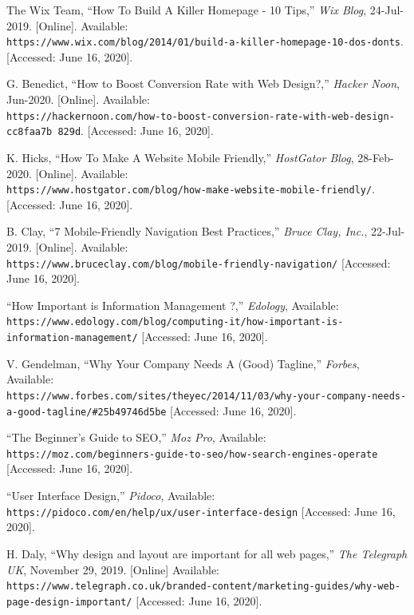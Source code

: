\documentclass[12pt]{article}
\begin{document}
\begin{thebibliography}{9}
The Wix Team, “How To Build A Killer Homepage - 10 Tips,” \textit{Wix Blog}, 24-Jul-2019.
[Online]. Available:
\\\texttt{https://www.wix.com/blog/2014/01/build-a-killer-homepage-10-dos-donts}.
[Accessed: June 16, 2020].

G. Benedict, “How to Boost Conversion Rate with Web Design?,” \textit{Hacker Noon}, 
Jun-2020. [Online]. Available: 
\\\texttt{https://hackernoon.com/how-to-boost-conversion-rate-with-web-design-cc8faa7b
829d}. [Accessed: June 16, 2020].
	
K. Hicks, “How To Make A Website Mobile Friendly,” \textit{HostGator Blog}, 28-Feb-2020.
[Online]. Available:
\\\texttt{https://www.hostgator.com/blog/how-make-website-mobile-friendly/}. [Accessed: June 16, 2020].

B. Clay, “7 Mobile-Friendly Navigation Best Practices,” \textit{Bruce Clay, Inc.},    22-Jul-2019. 
[Online]. Available: \\\texttt{https://www.bruceclay.com/blog/mobile-friendly-navigation/}
[Accessed: June 16, 2020].

 “How Important is Information Management ?,”  \textit{Edology}, Available: \\\texttt{https://www.edology.com/blog/computing-it/how-important-is-information-management/} [Accessed: June 16, 2020].

 V. Gendelman,  “Why Your Company Needs A (Good) Tagline,”  \textit{Forbes}, Available: \\\texttt{https://www.forbes.com/sites/theyec/2014/11/03/why-your-company-needs-a-good-tagline/\#25b49746d5be} [Accessed: June 16, 2020].

“The Beginner’s Guide to SEO,” \textit{Moz Pro}, Available: \\\texttt{https://moz.com/beginners-guide-to-seo/how-search-engines-operate} [Accessed: June 16, 2020].	

 “User Interface Design,” \textit{Pidoco}, Available:\\\texttt{https://pidoco.com/en/help/ux/user-interface-design} [Accessed: June 16, 2020].


H. Daly, “Why design and layout are important for all web pages,” \textit{The Telegraph UK}, November 29, 2019. [Online] Available: \\\texttt{https://www.telegraph.co.uk/branded-content/marketing-guides/why-web-page-design-important/} [Accessed: June 16, 2020].



\end{thebibliography}
\end{document}
